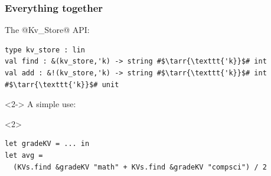 \documentclass[aspectratio=169,dvipsnames,svgnames,10pt]{beamer}
\begin{document}
\begin{frame}[fragile]
  \frametitle{Everything together}

  The @Kv_Store@ API:
\begin{verbatim}
type kv_store : lin
val find : &(kv_store,'k) -> string #$\tarr{\texttt{'k}}$# int
val add : &!(kv_store,'k) -> string #$\tarr{\texttt{'k}}$# int #$\tarr{\texttt{'k}}$# unit
\end{verbatim}
  
  \begin{onlyenv}<2->
    A simple use:
  \end{onlyenv}
  \begin{onlyenv}<2>
\begin{verbatim}
let gradeKV = ... in
let avg =
  (KVs.find &gradeKV "math" + KVs.find &gradeKV "compsci") / 2


\end{verbatim}
\end{onlyenv}
\end{frame}
\end{document}
